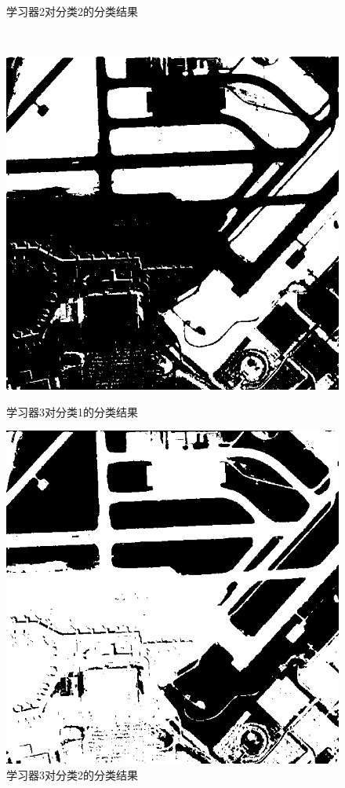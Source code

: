 \begin{figure}[H]
\begin{minipage}{0.45\linewidth}
		\caption{学习器2对分类2的分类结果}
	\end{minipage} \\
	\begin{minipage}{0.45\linewidth}
		\includegraphics[width=\linewidth]{figure/airport_44_Classifier_3_Class_1.png}
		\caption{学习器3对分类1的分类结果}
	\end{minipage}
	\begin{minipage}{0.45\linewidth}
		\includegraphics[width=\linewidth]{figure/airport_44_Classifier_3_Class_2.png}
		\caption{学习器3对分类2的分类结果}
	\end{minipage} 
\end{figure}
